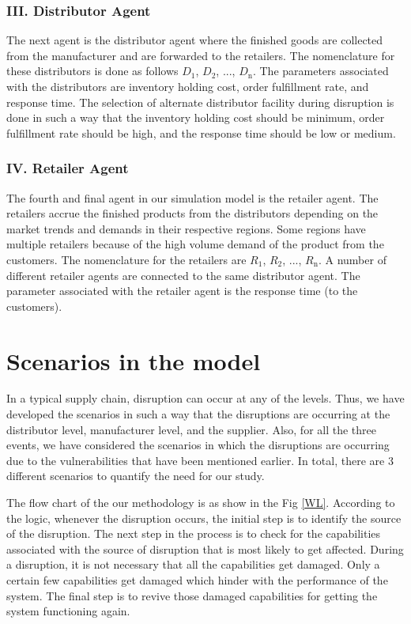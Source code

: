 \subsubsection{III. Distributor Agent}
The next agent is the distributor agent where the finished goods are collected from the manufacturer and are forwarded to the retailers. The nomenclature for these distributors is done as follows $D_{\text{1}}$, $D_{\text{2}}$, ..., $D_{\text{n}}$. The parameters associated with the distributors are inventory holding cost, order fulfillment rate, and response time. The selection of alternate distributor facility during disruption is done in such a way that the inventory holding cost should be minimum, order fulfillment rate should be high, and the response time should be low or medium. 

\subsubsection{IV. Retailer Agent}
The fourth and final agent in our simulation model is the retailer agent. The retailers accrue the finished products from the distributors depending on the market trends and demands in their respective regions. Some regions have multiple retailers because of the high volume demand of the product from the customers. The nomenclature for the retailers are $R_{\text{1}}$,  $R_{\text{2}}$, ..., $R_{\text{n}}$. A number of different retailer agents are connected to the same distributor agent. The parameter associated with the retailer agent is the response time (to the customers). 



\section{Scenarios in the model}
In a typical supply chain, disruption can occur at any of the levels. Thus, we have developed the scenarios in such a way that the disruptions are occurring at the distributor level, manufacturer level, and the supplier. Also, for all the three events, we have considered the scenarios in which the disruptions are occurring due to the vulnerabilities that have been mentioned earlier. In total, there are 3 different scenarios to quantify the need for our study.

 The flow chart of the our methodology is as show in the Fig \ref{WL}. According to the logic, whenever the disruption occurs, the initial step is to identify the source of the disruption. The next step in the process is to check for the capabilities associated with the source of disruption that is most likely to get affected. During a disruption, it is not necessary that all the capabilities get damaged. Only a certain few capabilities get damaged which hinder with the performance of the system. The final step is to revive those damaged capabilities for getting the system functioning again.
 
